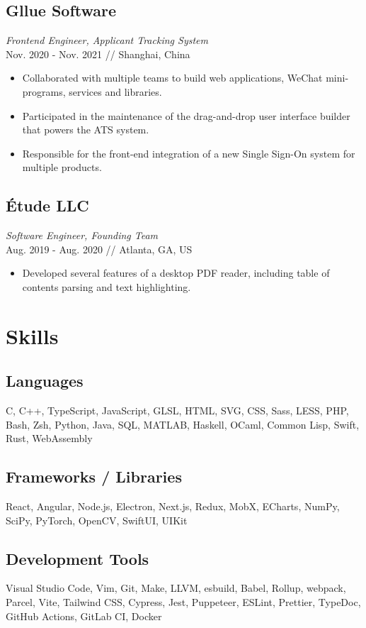 \documentclass[11pt,twocolumn]{article}
\begin{document}
\subsection*{Gllue Software}
\textit{Frontend Engineer, Applicant Tracking System}\\
Nov. 2020 - Nov. 2021 // Shanghai, China

\begin{itemize}
\item Collaborated with multiple teams to build web applications, WeChat mini-programs, services and libraries.
\item Participated in the maintenance of the drag-and-drop user interface builder that powers the ATS system.
\item Responsible for the front-end integration of a new Single Sign-On system for multiple products.
\end{itemize}

\subsection*{Étude LLC}
\textit{Software Engineer, Founding Team}\\
Aug. 2019 - Aug. 2020 // Atlanta, GA, US

\begin{itemize}
\item Developed several features of a desktop PDF reader, including table of contents parsing and text highlighting.
\end{itemize}

\section*{\textsf{Skills}}
\subsection*{Languages}
C, C++, TypeScript, JavaScript, GLSL, HTML, SVG, CSS, Sass, LESS, PHP, Bash, Zsh, Python, Java, SQL, MATLAB, Haskell, OCaml, Common Lisp, Swift, Rust, WebAssembly

\subsection*{Frameworks / Libraries}
React, Angular, Node.js, Electron, Next.js, Redux, MobX, ECharts, NumPy, SciPy, PyTorch, OpenCV, SwiftUI, UIKit

\subsection*{Development Tools}
Visual Studio Code, Vim, Git, Make, LLVM, esbuild, Babel, Rollup, webpack, Parcel, Vite, Tailwind CSS, Cypress, Jest, Puppeteer, ESLint, Prettier, TypeDoc, GitHub Actions, GitLab CI, Docker
\end{document}
